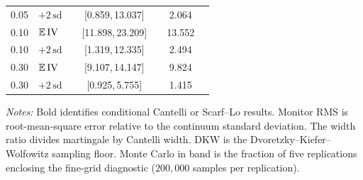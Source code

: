 \begin{table}[!htbp]
\begin{tabular}{@{}llrcccccc@{}}
0.05 & $+2\,\mathrm{sd}$ &  & \multicolumn{2}{c}{[0.859,\,13.037]} & \multicolumn{2}{c}{\bfseries\boldmath [0.859,\,6.729]} & 2.064 &  \\
0.10 & $\mathbb{E}\,\mathrm{IV}$ &  & \multicolumn{2}{c}{[11.898,\,23.209]} & \multicolumn{2}{c}{\bfseries\boldmath [11.898,\,18.427]} & 13.552 &  \\
0.10 & $+2\,\mathrm{sd}$ &  & \multicolumn{2}{c}{[1.319,\,12.335]} & \multicolumn{2}{c}{\bfseries\boldmath [1.319,\,7.068]} & 2.494 &  \\
0.30 & $\mathbb{E}\,\mathrm{IV}$ &  & \multicolumn{2}{c}{[9.107,\,14.147]} & \multicolumn{2}{c}{\bfseries\boldmath [9.107,\,13.256]} & 9.824 &  \\
0.30 & $+2\,\mathrm{sd}$ &  & \multicolumn{2}{c}{[0.925,\,5.755]} & \multicolumn{2}{c}{\bfseries\boldmath [0.925,\,4.822]} & 1.415 &  \\
\bottomrule\end{tabular}
\smallskip\par\raggedright\scriptsize\emph{Notes:} Bold identifies \RoughCertCV{} conditional Cantelli or Scarf--Lo results. Monitor RMS is root-mean-square error relative to the continuum standard deviation. The width ratio divides martingale by Cantelli width. DKW is the Dvoretzky--Kiefer--Wolfowitz sampling floor. Monte Carlo in band is the fraction of five replications enclosing the fine-grid diagnostic ($200{,}000$ samples per replication).
\end{table}
